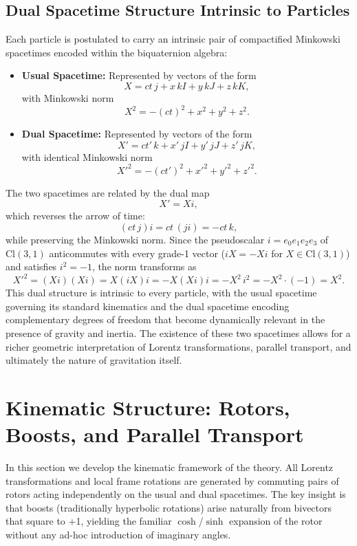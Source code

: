 \documentclass[dvipdfmx,a4paper]{article}
\begin{document}
\subsection{Dual Spacetime Structure Intrinsic to Particles}

Each particle is postulated to carry an intrinsic pair of compactified Minkowski spacetimes encoded within the biquaternion algebra:
\begin{itemize}
  \item \textbf{Usual Spacetime:} Represented by vectors of the form
  \[
  X = ct \, j + x \, kI + y \, kJ + z \, kK,
  \]
  with Minkowski norm
  \[
  X^2 = -(ct)^2 + x^2 + y^2 + z^2.
  \]

  \item \textbf{Dual Spacetime:} Represented by vectors of the form
  \[
  X' = ct' \, k + x' \, jI + y' \, jJ + z' \, jK,
  \]
  with identical Minkowski norm
  \[
  X'^2 = -(ct')^2 + x'^2 + y'^2 + z'^2.
  \]
\end{itemize}
The two spacetimes are related by the dual map
\[
X' = X i,
\]
which reverses the arrow of time:
\[
(ct \, j) i = ct \, (j i) = -ct \, k,
\]
while preserving the Minkowski norm. Since the pseudoscalar $i = e_0 e_1 e_2 e_3$ of $\mathrm{Cl}(3,1)$ anticommutes with every grade-1 vector ($i X = -X i$ for $X \in \mathrm{Cl}(3,1)$) and satisfies $i^2 = -1$, the norm transforms as
\[
X'^2 = (X i)(X i) = X (i X) i = -X (X i) i = -X^2\, i^2 = -X^2 \cdot (-1) = X^2.
\]
This dual structure is intrinsic to every particle, with the usual spacetime governing its standard kinematics and the dual spacetime encoding complementary degrees of freedom that become dynamically relevant in the presence of gravity and inertia. The existence of these two spacetimes allows for a richer geometric interpretation of Lorentz transformations, parallel transport, and ultimately the nature of gravitation itself.

\section{Kinematic Structure: Rotors, Boosts, and Parallel Transport}
\label{sec:kinematics}

In this section we develop the kinematic framework of the theory. All Lorentz transformations and local frame rotations are generated by commuting pairs of rotors acting independently on the usual and dual spacetimes. The key insight is that boosts (traditionally hyperbolic rotations) arise naturally from bivectors that square to +1, yielding the familiar $\cosh$/$\sinh$ expansion of the rotor without any ad-hoc introduction of imaginary angles.
\end{document}
